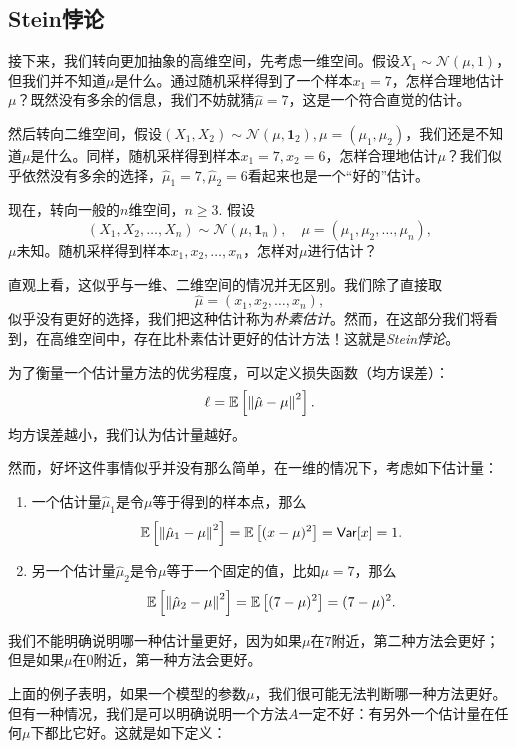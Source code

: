 \subsection{Stein悖论}
接下来，我们转向更加抽象的高维空间，先考虑一维空间。假设$X_1 \sim \mathcal{N}(\mu,1)$，但我们并不知道$\mu$是什么。通过随机采样得到了一个样本$x_1 = 7$，怎样合理地估计$\mu$？既然没有多余的信息，我们不妨就猜$\hat{\mu} = 7$，这是一个符合直觉的估计。

然后转向二维空间，假设$(X_1, X_2) \sim \mathcal{N}(\mu,\mathbf{1}_2), \mu=(\mu_1,\mu_2)$，我们还是不知道$\mu$是什么。同样，随机采样得到样本$x_1 = 7, x_2=6$，怎样合理地估计$\mu$？我们似乎依然没有多余的选择，$\hat{\mu}_1 = 7, \hat{\mu}_2=6$看起来也是一个“好的”估计。

现在，转向一般的$n$维空间，$n\geq 3$. 假设
\[(X_1,X_2,\dots, X_n) \sim \mathcal{N}(\mu, \mathbf{1}_n),\quad \mu=(\mu_1,\mu_2,\dots,\mu_n),\]
$\mu$未知。随机采样得到样本$x_1,x_2,\dots,x_n$，怎样对$\mu$进行估计？

直观上看，这似乎与一维、二维空间的情况并无区别。我们除了直接取
\begin{equation}
    \hat{\mu}=(x_1,x_2,\dots,x_n), \label{eq:naive-estimation}
\end{equation}
似乎没有更好的选择，我们把这种估计称为\emph{朴素估计}。然而，在这部分我们将看到，在高维空间中，存在比朴素估计更好的估计方法！这就是\emph{Stein悖论}。

为了衡量一个估计量方法的优劣程度，可以定义损失函数（均方误差）：
\[\ell = \mathbb{E}\left[\left\|\hat{\mu}-\mu\right\|^2\right].\]
均方误差越小，我们认为估计量越好。

然而，好坏这件事情似乎并没有那么简单，在一维的情况下，考虑如下估计量：
\begin{enumerate}
    \item 一个估计量$\hat\mu_1$是令$\mu$等于得到的样本点，那么
    \[\mathbb{E}\left[\left\|\hat{\mu}_1-\mu\right\|^2\right] = \mathbb{E}\left[(x-\mu)^2\right]=\mathsf{Var}[x]=1.\]
    \item 另一个估计量$\hat\mu_2$是令$\mu$等于一个固定的值，比如$\mu=7$，那么
    \[\mathbb{E}\left[\left\|\hat{\mu}_2-\mu\right\|^2\right] = \mathbb{E}\left[(7-\mu)^2\right]=(7-\mu)^2.\]
\end{enumerate}

我们不能明确说明哪一种估计量更好，因为如果$\mu$在$7$附近，第二种方法会更好；但是如果$\mu$在$0$附近，第一种方法会更好。

上面的例子表明，如果一个模型的参数$\mu$，我们很可能无法判断哪一种方法更好。但有一种情况，我们是可以明确说明一个方法$A$一定不好：有另外一个估计量在任何$\mu$下都比它好。这就是如下定义：

